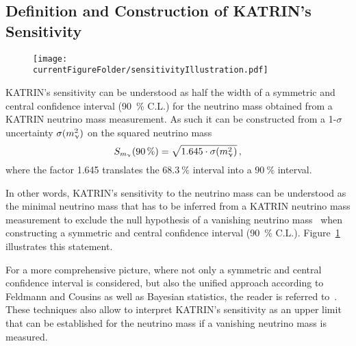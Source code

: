 \subsection{Definition and Construction of KATRIN's Sensitivity}
\label{sec:statMethodsSensitivtyDef}
\begin{figure}
	\centering
	\texttt{[image: \\currentFigureFolder/sensitivityIllustration.pdf]}
	\label{fig:statMethodsSensitivity}
\end{figure}

KATRIN's sensitivity can be understood as half the width of a symmetric and central confidence interval (\SI{90}{\percent} C.L.) for the neutrino mass obtained from a KATRIN neutrino mass measurement. As such it can be constructed from a 1-$\sigma$ uncertainty $\sigma(m_\upnu^2)$ on the squared neutrino mass~\cite{Angrik:2005ep}
\begin{equation}
\label{eq:statMethodsSensitivity}
S_{m_\upnu}(\SI{90}{\percent}) = \sqrt{1.645\cdot\sigma(m_\upnu^2)}
\text{\,,}
\end{equation}
where the factor 1.645 translates the $\SI{68.3}{\percent}$ interval into a $\SI{90}{\percent}$ interval.

In other words, KATRIN's sensitivity to the neutrino mass can be understood as the minimal neutrino mass that has to be inferred from a KATRIN neutrino mass measurement to exclude the null hypothesis of a vanishing neutrino mass~\cite{Kleesiek2014} when constructing a symmetric and central confidence interval (\SI{90}{\percent} C.L.). Figure~\ref{fig:statMethodsSensitivity} illustrates this statement.

For a more comprehensive picture, where not only a symmetric and central confidence interval is considered, but also the unified approach according to Feldmann and Cousins as well as Bayesian statistics, the reader is referred to~\cite{Kleesiek2019}. These techniques also allow to interpret KATRIN's sensitivity as an upper limit that can be established for the neutrino mass if a vanishing neutrino mass is measured.

